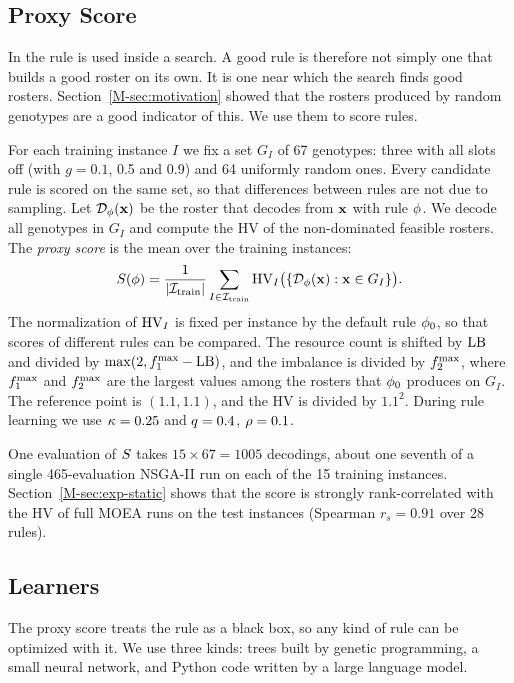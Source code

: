 \documentclass[journal]{IEEEtran}
\begin{document}
\subsection{Proxy Score}

In \RDD the rule is used inside a search.
A good rule is therefore not simply one that builds a good roster on its own.
It is one near which the search finds good rosters.
Section~\ref{M-sec:motivation} showed that the rosters produced by random genotypes are a good indicator of this.
We use them to score rules.

For each training instance $I$ we fix a set $G_I$ of 67 genotypes:
three with all slots off (with $g = 0.1$, 0.5 and 0.9) and 64 uniformly random ones.
Every candidate rule is scored on the same set, so that differences between rules are not due to sampling.
Let $\mathcal{D}_\phi(\mathbf{x})$ be the roster that \RDD decodes from $\mathbf{x}$ with rule $\phi$.
We decode all genotypes in $G_I$ and compute the HV of the non-dominated feasible rosters.
The \emph{proxy score} is the mean over the training instances:
\begin{equation}
  S(\phi) = \frac{1}{|\mathcal{I}_{\text{train}}|} \sum_{I \in \mathcal{I}_{\text{train}}} \mathrm{HV}_I\bigl(\{\mathcal{D}_\phi(\mathbf{x}) : \mathbf{x} \in G_I\}\bigr).
\end{equation}
The normalization of $\mathrm{HV}_I$ is fixed per instance by the default rule $\phi_0$, so that scores of different rules can be compared.
The resource count is shifted by $\mathrm{LB}$ and divided by $\max(2, f_{1}^{\max} - \mathrm{LB})$, and the imbalance is divided by $f_{2}^{\max}$,
where $f_{1}^{\max}$ and $f_{2}^{\max}$ are the largest values among the rosters that $\phi_0$ produces on $G_I$.
The reference point is $(1.1, 1.1)$, and the HV is divided by $1.1^2$.
During rule learning we use $\kappa = 0.25$ and $q = 0.4$, \ie $\rho = 0.1$.

One evaluation of $S$ takes $15 \times 67 = 1005$ decodings, about one seventh of a single 465-evaluation NSGA-II run on each of the 15 training instances.
Section~\ref{M-sec:exp-static} shows that the score is strongly rank-correlated with the HV of full MOEA runs on the test instances (Spearman $r_s = 0.91$ over 28 rules).


\subsection{Learners}

The proxy score treats the rule as a black box, so any kind of rule can be optimized with it.
We use three kinds: trees built by genetic programming, a small neural network, and Python code written by a large language model.
\end{document}
